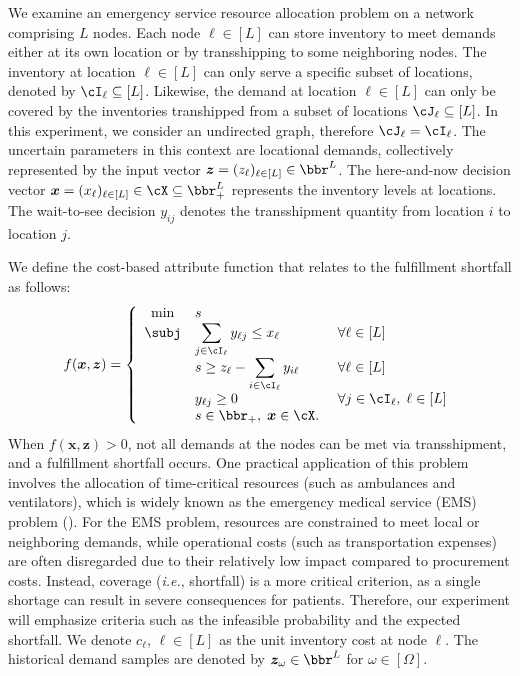 \documentclass[mnsc, nonblindrev]{informswp}
\newcommand{\1}[1]{\mathds{1}{\left(#1\right)}}
\begin{document}
We examine an emergency service resource allocation problem on a network comprising $L$ nodes. Each node $\ell \in [L]$ can store inventory to meet demands either at its own location or by transshipping to some neighboring nodes. The inventory at location $\ell \in [L]$ can only serve a specific subset of locations, denoted by $\cI_{\ell} \subseteq [L]$. Likewise, the demand at location $\ell \in [L]$ can only be covered by the inventories transhipped from a subset of locations $\cJ_{\ell} \subseteq [L]$. In this experiment, we consider an undirected graph, therefore $\cJ_{\ell} = \cI_{\ell}$. 
The uncertain parameters in this context are locational demands, collectively represented by the input vector $\bm z = (z_\ell)_{\ell \in [L]} \in \bbr^L$. The here-and-now decision vector $\bm x = (x_\ell)_{\ell \in [L]} \in \cX \subseteq \bbr^L_{+}$ represents the inventory levels at locations. The wait-to-see decision $y_{ij}$ denotes the transshipment quantity from location $i$ to location $j$.

We define the cost-based attribute function that relates to the fulfillment shortfall as follows:
\begin{equation} \label{FilfulmentShrotfall}
f(\bm x,\bm z) = \left\{
\begin{array}{cll}
\min &  s\\
\subj & \displaystyle \sum_{j \in \cI_\ell} y_{\ell j} \leq x_\ell &~\forall \ell \in [L]\\
    & \displaystyle s\geq  z_\ell - \sum_{i \in \cI_\ell} y_{i \ell} &~\forall \ell \in [L] \\
    & \displaystyle y_{\ell j} \geq 0 &~\forall  j \in \cI_{\ell}, \; \ell \in [L] \\ 
    & s \in \bbr_+, \; \bm x \in \cX. \\
\end{array} \right.
\end{equation}
When $f(\bm x, \bm z) > 0$, not all demands at the nodes can be met via transshipment, and a fulfillment shortfall occurs. One practical application of this problem involves the allocation of time-critical resources (such as ambulances and ventilators), which is widely known as the emergency medical service (EMS) problem (\citealt{boutilier2020ambulance, peng2020probabilistic}). For the EMS problem, resources are constrained to meet local or neighboring demands, while operational costs (such as transportation expenses) are often disregarded due to their relatively low impact compared to procurement costs. Instead, coverage (\textit{i.e.}, shortfall) is a more critical criterion, as a single shortage can result in severe consequences for patients. Therefore, our experiment will emphasize criteria such as the infeasible probability and the expected shortfall. We denote $c_\ell$, $\ell \in [L]$ as the unit inventory cost at node $\ell$. The historical demand samples are denoted by $\bm z_\omega \in \bbr^L$ for $\omega \in [\Omega]$. 
\end{document}
